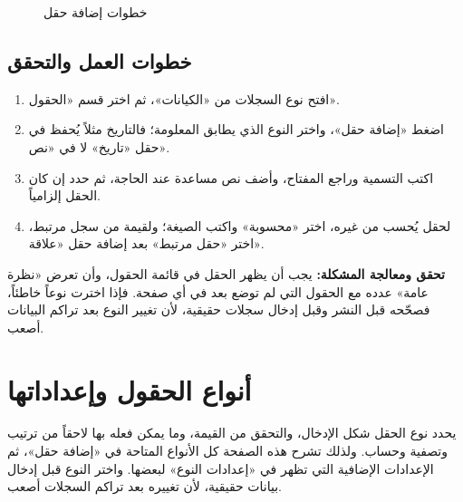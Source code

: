 \begin{figure}[H]
\centering
{}
\rclegend
\caption{خطوات إضافة حقل}
\label{fig:builder-fields-flow}
\end{figure}

\subsection{خطوات العمل والتحقق}
\begin{enumerate}
\item افتح نوع السجلات من «الكيانات»، ثم اختر قسم «الحقول».
\item اضغط «إضافة حقل»، واختر النوع الذي يطابق المعلومة؛ فالتاريخ مثلاً يُحفظ في حقل «تاريخ» لا في «نص».
\item اكتب التسمية وراجع المفتاح، وأضف نص مساعدة عند الحاجة، ثم حدد إن كان الحقل إلزامياً.
\item لحقل يُحسب من غيره، اختر «محسوبة» واكتب الصيغة؛ ولقيمة من سجل مرتبط، اختر «حقل مرتبط» بعد إضافة حقل «علاقة».
\end{enumerate}

\textbf{تحقق ومعالجة المشكلة:} يجب أن يظهر الحقل في قائمة الحقول، وأن تعرض «نظرة عامة» عدده مع الحقول التي لم توضع بعد في أي صفحة. فإذا اخترت نوعاً خاطئاً، فصحّحه قبل النشر وقبل إدخال سجلات حقيقية، لأن تغيير النوع بعد تراكم البيانات أصعب.

\clearpage
\section{أنواع الحقول وإعداداتها}
\label{sec:builder-feature-field-types}

يحدد نوع الحقل شكل الإدخال، والتحقق من القيمة، وما يمكن فعله بها لاحقاً من ترتيب وتصفية وحساب. ولذلك تشرح هذه الصفحة كل الأنواع المتاحة في «إضافة حقل»، ثم الإعدادات الإضافية التي تظهر في «إعدادات النوع» لبعضها. واختر النوع قبل إدخال بيانات حقيقية، لأن تغييره بعد تراكم السجلات أصعب.

